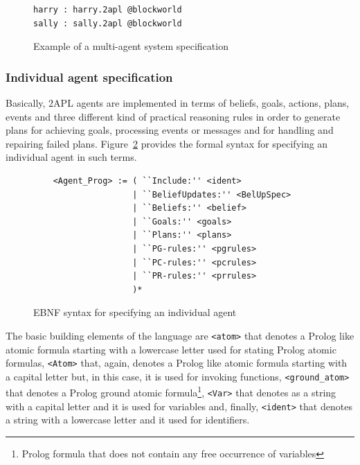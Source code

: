 \documentclass[a4paper]{article}
\begin{document}
\begin{figure}[htbp]
\begin{verbatim}
harry : harry.2apl @blockworld
sally : sally.2apl @blockworld
\end{verbatim}
\caption{Example of a multi-agent system specification}
\label{fig:ex_blockworld}
\end{figure}

\subsubsection{Individual agent specification} %

% 

Basically, 2APL agents are implemented in terms of beliefs, goals, actions, plans, events and three different kind of practical reasoning rules in order to generate plans for achieving goals, processing events or messages and for handling and repairing failed plans. Figure~\ref{fig:ebnf_agent} provides the formal syntax for specifying an individual agent in such terms.

\begin{figure}[htp]
\begin{verbatim}
	<Agent_Prog> := ( ``Include:'' <ident>
	                | ``BeliefUpdates:'' <BelUpSpec>
	                | ``Beliefs:'' <belief> 
	                | ``Goals:'' <goals> 
	                | ``Plans:'' <plans>
	                | ``PG-rules:'' <pgrules>
	                | ``PC-rules:'' <pcrules>
	                | ``PR-rules:'' <prrules>
	                )*
\end{verbatim}
\caption{EBNF syntax for specifying an individual agent}
\label{fig:ebnf_agent}
\end{figure}

The basic building elements of the language are \texttt{<atom>} that denotes a Prolog like atomic formula starting with a lowercase letter used for stating Prolog atomic formulas, \texttt{<Atom>} that, again, denotes a Prolog like atomic formula starting with a capital letter but, in this case, it is used for invoking functions, \texttt{<ground\_atom>} that denotes a Prolog ground atomic formula\footnote{Prolog formula that does not contain any free occurrence of variables}, \texttt{<Var>} that denotes as a string with a capital letter and it is used for variables and, finally, \texttt{<ident>} that denotes a string with a lowercase letter and it used for identifiers.
\end{document}
